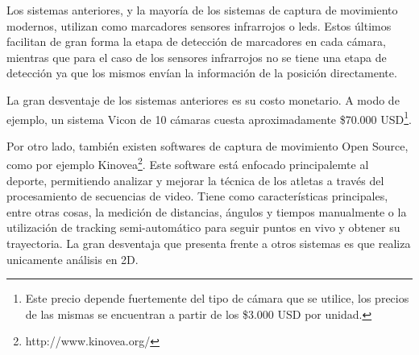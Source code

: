 Los sistemas anteriores, y la mayoría de los sistemas de captura de movimiento modernos, utilizan como marcadores sensores infrarrojos o leds. Estos últimos facilitan de gran forma la etapa de detección de marcadores en cada cámara, mientras que para el caso de los sensores infrarrojos no se tiene una etapa de detección ya que los mismos envían la información de la posición directamente.

La gran desventaje de los sistemas anteriores es su costo monetario. A modo de ejemplo, un sistema Vicon de 10 cámaras cuesta aproximadamente \$70.000 USD\footnote{Este precio depende fuertemente del tipo de cámara que se utilice, los precios de las mismas se encuentran a partir de los \$3.000 USD por unidad.}.

Por otro lado, también existen softwares de captura de movimiento Open Source, como por ejemplo Kinovea\footnote{http://www.kinovea.org/}. Este software está enfocado principalemte al deporte, permitiendo analizar y mejorar la técnica de los atletas a través del procesamiento de secuencias de video. Tiene como características principales, entre otras cosas, la medición de distancias, ángulos y tiempos manualmente o la utilización de tracking semi-automático para seguir puntos en vivo y obtener su trayectoria. La gran desventaja que presenta frente a otros sistemas es que realiza unicamente análisis en 2D.


